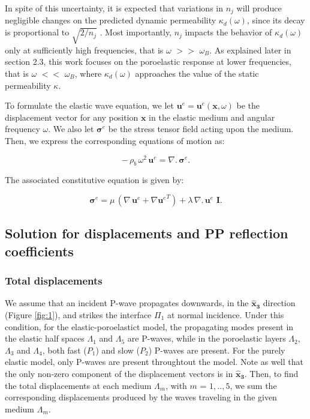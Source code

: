 \documentclass[draft]{agujournal2019}
\begin{document}
In spite of this uncertainty, it is expected that variations in $n_j$ will produce negligible changes on the predicted dynamic permeability $\kappa_d (\omega)$, since its decay is proportional to $\sqrt{2/n_j}$ \cite{Pride2003}. Most importantly, $n_j$ impacts the behavior of $\kappa_d (\omega)$ only at sufficiently high frequencies, that is $\omega$ $>>$ $\omega_B$. As explained later in section 2.3, this work focuses on the poroelastic response at lower frequencies, that is $\omega$ $<<$ $\omega_B$, where $\kappa_d (\omega)$ approaches the value of the static permeability $\kappa$.

To formulate the elastic wave equation, we let $\bm{u}^e=\bm{u}^e (\bm{x},\omega)$ be the displacement vector for any position $\bm{x}$ in the elastic medium and angular frequency $\omega$. We also let $\bm{\sigma}^e$ be the stress tensor field acting upon the medium. Then, we express the corresponding equations of motion as:
\begin{linenomath*}
\begin{equation}\label{Eq.6}
- \, \rho_b \,\omega^2 \, \bm{u}^e = \nabla . \, \bm{\sigma}^e.
\end{equation}
\end{linenomath*}
The associated constitutive equation is given by: 
\begin{linenomath*}
\begin{equation}\label{Eq.7}
\bm{\sigma}^e = \mu \,  \left( \nabla \, \bm{u}^e + {\nabla  \bm{u}^e}^T  \right) + \lambda \,  \nabla . \, \bm{u}^e\,\, \bm{I}.
\end{equation}
\end{linenomath*}
 

\subsection{Solution for displacements and PP reflection coefficients}
\subsubsection{Total displacements}
We assume that an incident P-wave propagates downwards, in the $\bm{\hat x_3}$ direction (Figure \ref{fig:1}), and strikes the interface $\Pi_1$ at normal incidence. 
Under this condition, for the elastic-poroelastict model, the propagating modes present in the elastic half spaces $\Lambda_1$ and $\Lambda_5$ are P-waves, while in the poroelastic layers $\Lambda_2$, $\Lambda_3$ and $\Lambda_4$, both fast ($P_1$) and slow ($P_2$) P-waves are present. For the purely elastic model,  only P-waves are present throughtout the model.
Note as well that the only non-zero component of the displacement vectors is in $\bm{\hat x_3}$.
Then, to find the total displacements at each medium $\Lambda_m$, with $m$ = $1,..,5$, we sum the corresponding displacements produced by the waves traveling in the given medium $\Lambda_m$.
\end{document}
